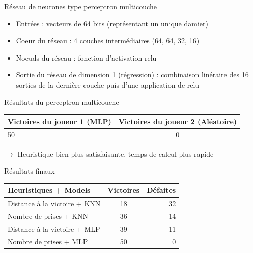 \documentclass{beamer}
\begin{document}
\begin{frame}{Réseau de neurones type perceptron multicouche}
    \begin{itemize}
        \item Entrées : vecteurs de 64 bits (représentant un unique damier)
        \item Coeur du réseau : 4 couches intermédiaires (64, 64, 32, 16)
        \item Noeuds du réseau : fonction d'activation \alert{relu}
        \item Sortie du réseau de dimension 1 (régression) : combinaison linéraire des 16 sorties de la dernière couche puis d'une application de \alert{relu}
    \end{itemize}
\end{frame}

\begin{frame} {Résultats du perceptron multicouche}
    \begin{center}
        \begin{tabular}{ | l | c | }
            \hline
            Victoires du joueur 1 (MLP) & Victoires du joueur 2 (Aléatoire) \\ \hline
            50                          & 0                                 \\ \hline
        \end{tabular}
    \end{center}
    $\rightarrow$ Heuristique bien plus satisfaisante, temps de calcul plus rapide
\end{frame}

\begin{frame}{Résultats finaux}
    \begin{center}
        \begin{tabular}{ | l || c | r |}
            \hline 
            Heuristiques + Models & Victoires & Défaites \\
            \hline 
            \hline 
            Distance à la victoire + KNN & 18 & 32 \\
            Nombre de prises + KNN & 36 & 14 \\
            Distance à la victoire + MLP & 39 & 11 \\
            Nombre de prises + MLP & 50 & 0 \\ \hline
        \end{tabular}

    \end{center}
\end{frame}
\end{document}
